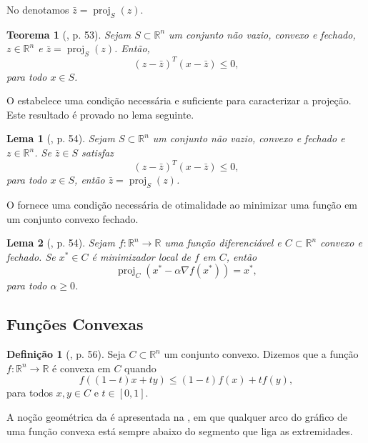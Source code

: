 \documentclass[12pt,a4paper]{scrartcl}
\DeclareMathOperator{\proj}{proj}
\def\RR{\mathds{R}}
\newtheorem{teo}{Teorema}
\newtheorem{lema}{Lema}
\theoremstyle{definition}%
\newtheorem{defi}{Definição}
\begin{document}
No  denotamos $\bar{z} = \proj_{S} (z)$.

\begin{teo} [\textcite{Ademir2013}, p. 53] \label{lema_condicaoprojecao_convexidade}
Sejam $S \subset \RR^{n}$ um conjunto não vazio, convexo e fechado, $z \in \RR^{n}$ e $\bar{z} = \proj_{S} (z)$. Então, 
\[
(z - \bar{z})^{T}(x - \bar{z}) \leq 0 ,
\]
para todo $x \in S$.
\end{teo}

O  estabelece uma condição necessária e suficiente para caracterizar a projeção. Este resultado é provado no lema seguinte.

\begin{lema} [\textcite{Ademir2013}, p. 54] \label{lema_defineprojecao_convexidade}
Sejam $S \subset \RR^{n}$ um conjunto não vazio, convexo e fechado e $z \in \RR^{n}$. Se $\bar{z} \in S$ satisfaz
\[
(z - \bar{z})^{T}(x - \bar{z}) \leq 0 ,
\]
para todo $x \in S$, então $\bar{z} = \proj_{S} (z)$.
\end{lema}

O  fornece uma condição necessária de otimalidade ao minimizar uma função em um conjunto convexo fechado.

\begin{lema} [\textcite{Ademir2013}, p. 54]
Sejam $f: \RR^{n} \rightarrow \RR$ uma função diferenciável e $C \subset \RR^{n}$ convexo e fechado. Se $x^{*} \in C$ é minimizador local de $f$ em $C$, então
\[
\proj_{C} (x^{*} - \alpha \nabla f(x^{*})) = x^{*} ,
\]
para todo $\alpha \geq 0$.
\end{lema}

\subsection{Funções Convexas}

\begin{defi} [\textcite{Ademir2013}, p. 56] \label{defi:funcao_convexa}
Seja $C \subset \RR^{n}$ um conjunto convexo. Dizemos que a função $f: \RR^{n} \rightarrow \RR$ é convexa em $C$ quando
\[
f((1-t)x + ty) \leq (1-t)f(x) + tf(y),
\]
para todos $x,y \in C$ e $t \in [0,1]$.
\end{defi}

A noção geométrica da  é apresentada na , em que qualquer arco do gráfico de uma função convexa está sempre abaixo do segmento que liga as extremidades.
\end{document}
